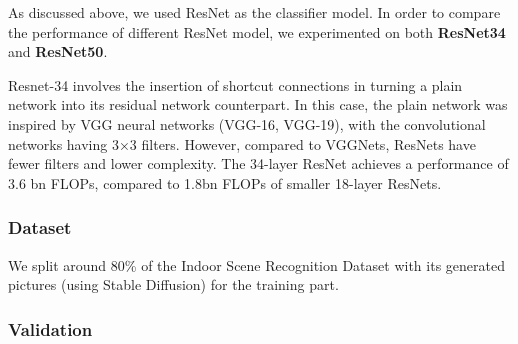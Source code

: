 \documentclass[11pt]{article}
\begin{document}
As discussed above, we used ResNet as the classifier model. In order to compare the performance of different ResNet model, we experimented on both \textbf{ResNet34} and \textbf{ResNet50}.

Resnet-34 involves the insertion of shortcut connections in turning a plain network into its residual network counterpart. In this case, the plain network was inspired by VGG neural networks (VGG-16, VGG-19), with the convolutional networks having 3×3 filters. However, compared to VGGNets, ResNets have fewer filters and lower complexity. The 34-layer ResNet achieves a performance of 3.6 bn FLOPs, compared to 1.8bn FLOPs of smaller 18-layer ResNets.


\subsubsection{Dataset}

We split around 80\% of the Indoor Scene Recognition Dataset with its generated pictures (using Stable Diffusion) for the training part.

\subsubsection{Validation}
\end{document}
